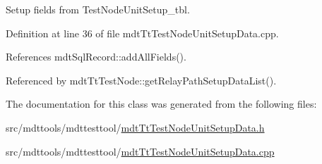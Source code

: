 Setup fields from Test\-Node\-Unit\-Setup\-\_\-tbl. 



Definition at line 36 of file mdt\-Tt\-Test\-Node\-Unit\-Setup\-Data.\-cpp.



References mdt\-Sql\-Record\-::add\-All\-Fields().



Referenced by mdt\-Tt\-Test\-Node\-::get\-Relay\-Path\-Setup\-Data\-List().



The documentation for this class was generated from the following files\-:\begin{DoxyCompactItemize}
\item 
src/mdttools/mdttesttool/\hyperlink{mdt_tt_test_node_unit_setup_data_8h}{mdt\-Tt\-Test\-Node\-Unit\-Setup\-Data.\-h}\item 
src/mdttools/mdttesttool/\hyperlink{mdt_tt_test_node_unit_setup_data_8cpp}{mdt\-Tt\-Test\-Node\-Unit\-Setup\-Data.\-cpp}\end{DoxyCompactItemize}
